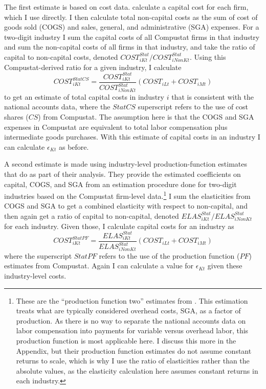 \documentclass[11pt]{article}
\begin{document}
The first estimate is based on cost data. \cite{dleu2020} calculate a capital cost for each firm, which I use directly. I then calculate total non-capital costs as the sum of cost of goods sold (COGS) and sales, general, and administrative (SGA) expenses. For a two-digit industry I sum the capital costs of all Compustat firms in that industry and sum the non-capital costs of all firms in that industry, and take the ratio of capital to non-capital costs, denoted $COST^{Stat}_{iKt}/COST^{Stat}_{iNonKt}$. Using this Compustat-derived ratio for a given industry, I calculate 
\begin{equation}
    COST^{StatCS}_{iKt} = \frac{COST^{Stat}_{iKt}}{COST^{Stat}_{iNonKt}}\left(COST_{iLt} + COST_{iMt}\right) \label{EQ_comp_cost_calc}
\end{equation}
to get an estimate of total capital costs in industry $i$ that is consistent with the national accounts data, where the $StatCS$ superscript refers to the use of cost shares ($CS$) from Compustat. The assumption here is that the COGS and SGA expenses in Compustat are equivalent to total labor compensation plus intermediate goods purchases. With this estimate of capital costs in an industry I can calculate $\epsilon_{Kt}$ as before.

A second estimate is made using industry-level production-function estimates that \cite{dleu2020} do as part of their analysis. They provide the estimated coefficients on capital, COGS, and SGA from an estimation procedure done for two-digit industries based on the Compustat firm-level data.\footnote{These are the ``production function two'' estimates from \cite{dleu2020}. This estimation treats what are typically considered overhead costs, SGA, as a factor of production. As there is no way to separate the national accounts data on labor compensation into payments for variable versus overhead labor, this production function is most applicable here. I discuss this more in the Appendix, but their production function estimates do not assume constant returns to scale, which is why I use the ratio of elasticities rather than the absolute values, as the elasticity calculation here assumes constant returns in each industry.} I sum the elasticities from COGS and SGA to get a combined elasticity with respect to non-capital, and then again get a ratio of capital to non-capital, denoted $ELAS^{Stat}_{iKt}/ELAS^{Stat}_{iNonKt}$ for each industry. Given those, I calculate capital costs for an industry as 
\begin{equation}
    COST^{StatPF}_{iKt} = \frac{ELAS^{Stat}_{iKt}}{ELAS^{Stat}_{iNonKt}}\left(COST_{iLt} + COST_{iMt}\right) \label{EQ_comp_pf_calc}
\end{equation}
where the superscript $StatPF$ refers to the use of the production function ($PF$) estimates from Compustat. Again I can calculate a value for $\epsilon_{Kt}$ given these industry-level costs.
\end{document}
